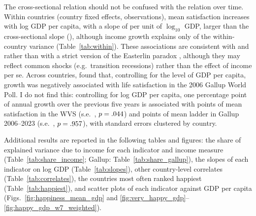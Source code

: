\documentclass[11pt]{article}
\begin{document}
The cross-sectional relation should not be confused with the relation over time. Within countries (country fixed effects, \nWithin observations), mean satisfaction increases with log GDP per capita, with a slope of \withinSlopeSatisfiedMean per unit of $\log_{10}$ GDP, larger than the cross-sectional slope (\crossSlopeSatisfiedMean), although income growth explains only \withinRtwoSatisfiedMean of the within-country variance (Table~\ref{tab:within}). These associations are consistent with \citet{stevenson_economic_2008} and \citet{sacks_new_2012} rather than with a strict version of the Easterlin paradox \citep{easterlin_does_1974,easterlin_happiness_2010}, although they may reflect common shocks (e.g.\ transition recessions) rather than the effect of income per se. Across countries, \citet{deaton_income_2008} found that, controlling for the level of GDP per capita, growth was negatively associated with life satisfaction in the 2006 Gallup World Poll. I do not find this: controlling for log GDP per capita, one percentage point of annual growth over the previous five years is associated with \growthCoefWVS points of mean satisfaction in the WVS (s.e.\ \growthSeWVS, $p = .044$) and \growthCoefGallup points of mean ladder in Gallup 2006--2023 (s.e.\ \growthSeGallup, $p = .957$), with standard errors clustered by country.

Additional results are reported in the following tables and figures: the share of explained variance due to income for each indicator and income measure (Table~\ref{tab:share_income}; Gallup: Table~\ref{tab:share_gallup}), the slopes of each indicator on log GDP (Table~\ref{tab:slopes}), other country-level correlates (Table~\ref{tab:correlates}), the countries most often ranked happiest (Table~\ref{tab:happiest}), and scatter plots of each indicator against GDP per capita (Figs.~\ref{fig:happiness_mean_gdp} and \ref{fig:very_happy_gdp}--\ref{fig:happy_gdp_w7_weighted}).
\end{document}
